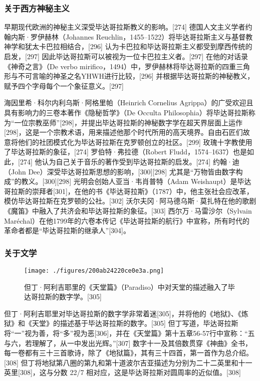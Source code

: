 \subsubsection{关于西方神秘主义}
早期现代欧洲的神秘主义深受毕达哥拉斯教义的影响。[274] 德国人文主义学者约翰内斯·罗伊赫林（Johannes Reuchlin，1455–1522）将毕达哥拉斯主义与基督教神学和犹太卡巴拉相结合，[296] 认为卡巴拉和毕达哥拉斯主义都受到摩西传统的启发，[297] 因此毕达哥拉斯可以被视为一位卡巴拉主义者。[297] 在他的对话录《神奇之言》（De verbo mirifico，1494）中，罗伊赫林将毕达哥拉斯的四重三角形与不可言喻的神圣之名YHWH进行比较，[296] 并根据毕达哥拉斯的神秘教义，赋予四个字母每个一个象征意义。[297]

海因里希·科尔内利乌斯·阿格里帕（Heinrich Cornelius Agrippa）的广受欢迎且具有影响力的三卷本著作《隐秘哲学》（De Occulta Philosophia）将毕达哥拉斯称为“一位宗教巫师”[298]，并提出毕达哥拉斯的神秘数字学在超天界层面上运作[298]，这是一个宗教术语，用来描述他那个时代所用的高天境界。自由石匠们故意将他们的社团模式化为毕达哥拉斯在克罗顿创立的社区。[299] 玫瑰十字教使用了毕达哥拉斯的象征，[274] 罗伯特·弗拉德（Robert Fludd，1574–1637）也是如此，[274] 他认为自己关于音乐的著作受到毕达哥拉斯的启发。[274] 约翰·迪（John Dee）深受毕达哥拉斯思想的影响，[300][298] 尤其是“万物皆由数字构成”的教义。[300][298] 光明会创始人亚当·韦肖普特（Adam Weishaupt）是毕达哥拉斯的崇拜者[301]，在他的书《毕达哥拉斯》（1787）中，他主张社会应改革，模仿毕达哥拉斯在克罗顿的公社。[302] 沃尔夫冈·阿马德乌斯·莫扎特在他的歌剧《魔笛》中融入了共济会和毕达哥拉斯的象征。[303] 西尔万·马雷沙尔（Sylvain Maréchal）在他1799年的六卷本传记《毕达哥拉斯的航行》中宣称，所有时代的革命者都是“毕达哥拉斯的继承人”[304]。
\subsubsection{关于文学}
\begin{figure}[ht]
\centering
\texttt{[image: ./figures/200ab24220ce0e3a.png]}
\caption{但丁·阿利吉耶里的《天堂篇》（Paradiso）中对天堂的描述融入了毕达哥拉斯的数字学。[305]} \label{fig_Pythag_18}
\end{figure}
但丁·阿利吉耶里对毕达哥拉斯的数字学非常着迷[305]，并将他的《地狱》、《炼狱》和《天堂》的描述基于毕达哥拉斯的数字。[305] 但丁写道，毕达哥拉斯将“一”视为善，将“多”视为恶[306]，并在《天堂篇》第十五章56-57行中宣称：“五与六，若理解了，从一中发出光辉。”[307] 数字十一及其倍数贯穿《神曲》全书，每一卷都有三十三首歌诗，除了《地狱篇》，其有三十四首，第一首作为总介绍。[308] 但丁将地狱第八圈的第九和第十道波尔吉亚描述为分别为二十二英里和十一英里[308]，这与分数 ⁠ 22/7⁠ 相对应，这是毕达哥拉斯对圆周率的近似值。[308]

